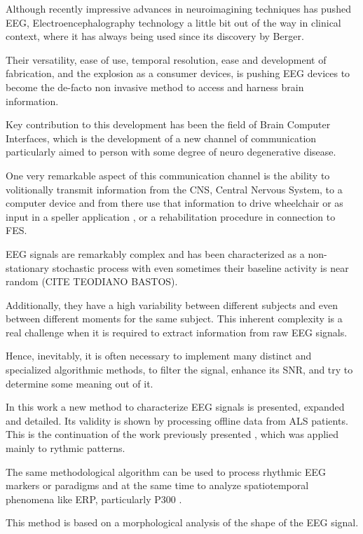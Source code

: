 \documentclass[entropy,article,submit,moreauthors,pdftex,10pt,a4paper]{mdpi}
\begin{document}
Although recently impressive advances in neuroimagining techniques has pushed EEG, Electroencephalography technology a little bit out of the way in clinical context, where it has always being used since its discovery by Berger.

Their versatility, ease of use, temporal resolution, ease and development of fabrication, and the explosion as a consumer devices, is pushing EEG devices to become the de-facto non invasive method to access and harness brain information.

Key contribution to this development has been the field of Brain Computer Interfaces, which is the development of a new channel of communication particularly aimed to person with some degree of neuro degenerative disease.

One very remarkable aspect of this communication channel is the ability to volitionally transmit information from the CNS, Central Nervous System, to a computer device and from there use that information to drive wheelchair or as input in a speller application \citep{Guger2009a}, or a rehabilitation procedure \citep{Jure2016} in connection to FES.

EEG signals are remarkably complex and has been characterized as a non-stationary stochastic process with even sometimes their baseline activity is near random (CITE TEODIANO BASTOS).

Additionally, they have a high variability between different subjects and even between different moments for the same subject.  This inherent complexity is a real challenge when it is required to extract information from raw EEG signals.

Hence, inevitably, it is often necessary to implement many distinct and specialized algorithmic methods, to filter the signal, enhance its SNR, and try to determine some meaning out of it.  

In this work a new method to characterize EEG signals is presented, expanded and detailed.  Its validity is shown by processing offline data from ALS patients.  This is the continuation of the work previously presented \citep{Ramele2016}, which was applied mainly to rythmic patterns.

The same methodological algorithm can be used to process rhythmic EEG markers or paradigms and at the same time to analyze spatiotemporal phenomena like ERP, particularly P300 \citep{Ramele2016}.

This method is based on a morphological analysis of the shape of the EEG signal.
\end{document}
